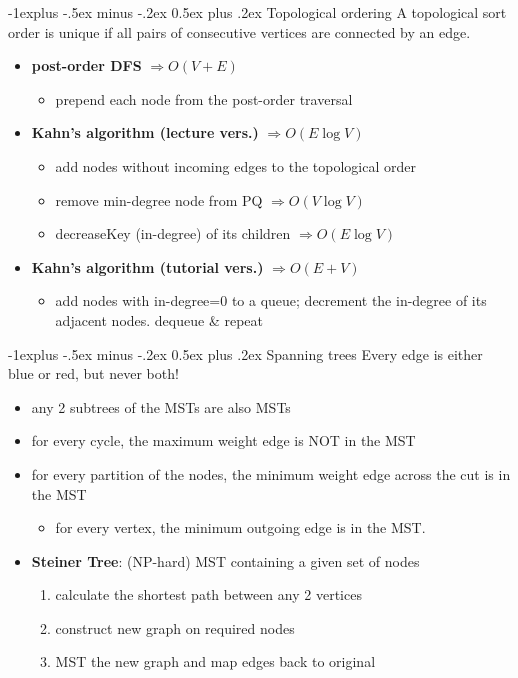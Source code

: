 \documentclass[10pt, landscape]{article}
\makeatletter
\renewcommand{\subsection}{\@startsection{subsection}{2}{0mm}%
                                {-1explus -.5ex minus -.2ex}%
                                {0.5ex plus .2ex}%
                                {\normalfont\normalsize\bfseries}}
\let\then\Rightarrow
\makeatother
\begin{document}
\begin{multicols}{4}
\subsection{Topological ordering}
A topological sort order is unique if all pairs of consecutive vertices are connected by an edge.
\begin{itemize}
    \item \textbf{post-order DFS} $\then O(V+E)$
    \begin{itemize}
        \item prepend each node from the post-order traversal
    \end{itemize}
    \item \textbf{Kahn's algorithm (lecture vers.)} $\then O(E \log V)$
    \begin{itemize}
        \item add nodes without incoming edges to the topological order
        \item  remove min-degree node from PQ $\then O(V\log V)$
        \item  decreaseKey (in-degree) of its children $\then O(E\log V)$
    \end{itemize}
    \item \textbf{Kahn's algorithm (tutorial vers.)} $\then O(E + V)$
    \begin{itemize}
        \item add nodes with in-degree=0 to a queue; decrement the in-degree of its adjacent nodes. dequeue \& repeat
    \end{itemize}
\end{itemize}

\subsection{Spanning trees}
Every edge is either blue or red, but never both!
\begin{itemize}
    \item any 2 subtrees of the MSTs are also MSTs
    \item for every cycle, the maximum weight edge is NOT in the MST
    \item for every partition of the nodes, the minimum weight edge across the cut is in the MST
    \begin{itemize}
        \item for every vertex, the minimum outgoing edge is in the MST.
    \end{itemize}
    \item \textbf{Steiner Tree}: (NP-hard) MST containing a given set of nodes
    \begin{enumerate}
        \item calculate the shortest path between any 2 vertices
        \item construct new graph on required nodes
        \item MST the new graph and map edges back to original
    \end{enumerate}
\end{itemize}


\end{multicols}
\end{document}
